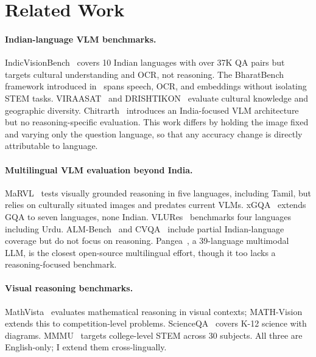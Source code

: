 \documentclass[11pt,a4paper]{article}
\begin{document}
\section{Related Work}
\label{sec:related}

\paragraph{Indian-language VLM benchmarks.}
IndicVisionBench~\citep{faraz2025indicvisionbench} covers 10 Indian languages with over 37K QA pairs but targets cultural understanding and OCR, not reasoning.
The BharatBench framework introduced in~\citet{khan2025chitrarth} spans speech, OCR, and embeddings without isolating STEM tasks.
VIRAASAT~\citep{surana2026viraasat} and DRISHTIKON~\citep{maji2025drishtikon} evaluate cultural knowledge and geographic diversity.
Chitrarth~\citep{khan2025chitrarth} introduces an India-focused VLM architecture but no reasoning-specific evaluation.
This work differs by holding the image fixed and varying only the question language, so that any accuracy change is directly attributable to language.

\paragraph{Multilingual VLM evaluation beyond India.}
MaRVL~\citep{liu2021marvl} tests visually grounded reasoning in five languages, including Tamil, but relies on culturally situated images and predates current VLMs.
xGQA~\citep{pfeiffer2022xgqa} extends GQA to seven languages, none Indian.
VLURes~\citep{atuhurra2025vlures} benchmarks four languages including Urdu.
ALM-Bench~\citep{vayani2024alm} and CVQA~\citep{romero2024cvqa} include partial Indian-language coverage but do not focus on reasoning.
Pangea~\citep{yue2024pangea}, a 39-language multimodal LLM, is the closest open-source multilingual effort, though it too lacks a reasoning-focused benchmark.

\paragraph{Visual reasoning benchmarks.}
MathVista~\citep{lu2024mathvista} evaluates mathematical reasoning in visual contexts; MATH-Vision~\citep{wang2024mathvision} extends this to competition-level problems.
ScienceQA~\citep{lu2022scienceqa} covers K-12 science with diagrams.
MMMU~\citep{yue2024mmmu} targets college-level STEM across 30 subjects.
All three are English-only; I extend them cross-lingually.
\end{document}
